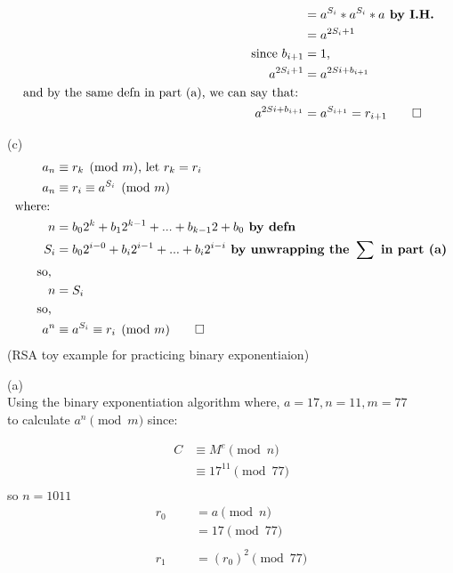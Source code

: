 \documentclass{assignment}
\begin{document}
\begin{flushleft}
\begin{problemlist}
\begin{align*}
&= a^{S_i} * a^{S_i} * a \textbf{ by I.H. }\\
&= a^{2S_{i} + 1}\\
\text{ since } b_{i+1} &= 1\text{, }\\
a^{2S_{i} + 1} &= a^{2S{i} + b_{i+1}}\\
\text{and by the same defn in part (a), we can say that: }\\
a^{2S{i} + b_{i+1}} &= a^{S_{i+1}} = r_{i+1} \qed\\ 
\end{align*}
\newpage
\item [(c)]\hspace{1cm}\\
\begin{align*}
a_n &\equiv r_k \pmod{m} \text{, let } r_k = r_i\\
a_n &\equiv r_i \equiv a^{S_i} \pmod{m}\\
\text {where: }\\
n &= b_02^k + b_12^{k-1} + ... + b_{k-1}2 + b_0 \textbf{ by defn}\\
S_i &= b_02^{i-0} + b_i2^{i-1} + ... + b_i2^{i-i}\textbf{ by unwrapping the }\sum \textbf{ in part (a)}\\
\text{so, }\\
n &= S_i\\
\text{ so, }\\
a^n &\equiv a^{S_i} \equiv r_i \pmod{m}\qed\\
\end{align*}
\newpage
\pbitem (RSA toy example for practicing binary exponentiaion)
\item [(a)] \hspace{1cm}\\
Using the binary exponentiation algorithm where, $a = 17, n = 11, m = 77$\\
to calculate $a^n \pmod m$ since:\\
\begin{singlespace}
\begin{align*}
C &\equiv M^e \pmod n\\
&\equiv 17^{11} \pmod {77}\\
\end{align*}
so $n = 1011$\\
\begin{align*}
r_0 &= a \pmod n\\
&= 17 \pmod {77}\\
\hspace{1cm}\\
r_1 &= (r_{0})^2 \pmod {77}\\ 

\end{align*}
\end{singlespace}
\end{problemlist}
\end{flushleft}
\end{document}
